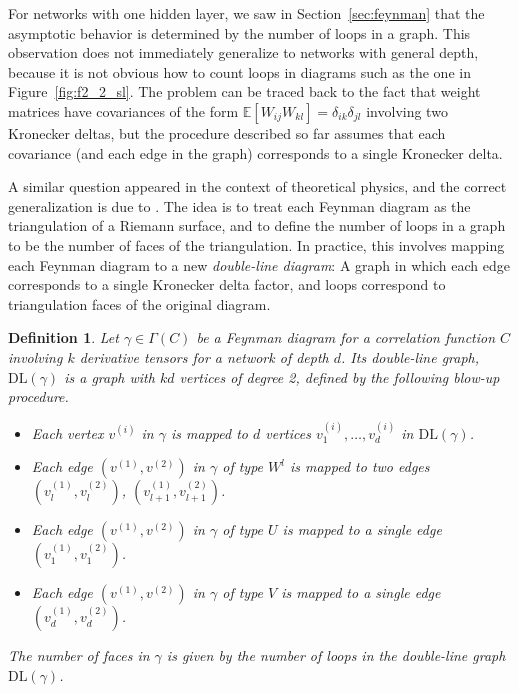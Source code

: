 \documentclass[english]{article}
\newtheorem{definition}{Definition}
\newcommand{\DL}{\mathrm{DL}}
\newcommand{\lexp}{\mathbb{E}\left[}
\newcommand{\rexp}{\right]}
\begin{document}
For networks with one hidden layer, we saw in Section~\ref{sec:feynman} that the asymptotic behavior is determined by the number of loops in a graph.
This observation does not immediately generalize to networks with general depth, because it is not obvious how to count loops in diagrams such as the one in Figure~\ref{fig:f2_2_sl}.
The problem can be traced back to the fact that weight matrices have covariances of the form $\lexp W_{ij} W_{kl} \rexp = \delta_{ik} \delta_{jl}$ involving two Kronecker deltas, but the procedure described so far assumes that each covariance (and each edge in the graph) corresponds to a single Kronecker delta.

A similar question appeared in the context of theoretical physics, and the correct generalization is due to \cite{tHooft:1973alw}.
The idea is to treat each Feynman diagram as the triangulation of a Riemann surface, and to define the number of loops in a graph to be the number of faces of the triangulation.
In practice, this involves mapping each Feynman diagram to a new \emph{double-line diagram}: A graph in which each edge corresponds to a single Kronecker delta factor, and loops correspond to triangulation faces of the original diagram.
\begin{definition} \label{def:dl}
  Let $\gamma \in \Gamma(C)$ be a Feynman diagram for a correlation function $C$ involving $k$ derivative tensors for a network of depth $d$.
  Its \emph{double-line graph}, $\DL(\gamma)$ is a graph with $kd$ vertices of degree 2, defined by the following blow-up procedure.
  \begin{itemize}
  \item Each vertex $v^{(i)}$ in $\gamma$ is mapped to $d$ vertices $v^{(i)}_1,\dots,v^{(i)}_{d}$ in $\DL(\gamma)$.
  \item Each edge $(v^{(1)},v^{(2)})$ in $\gamma$ of type $W^l$ is mapped to two edges $(v^{(1)}_l,v^{(2)}_l)$, $(v^{(1)}_{l+1},v^{(2)}_{l+1})$.
  \item Each edge $(v^{(1)},v^{(2)})$ in $\gamma$ of type $U$ is mapped to a single edge $(v^{(1)}_1,v^{(2)}_1)$.
  \item Each edge $(v^{(1)},v^{(2)})$ in $\gamma$ of type $V$ is mapped to a single edge $(v^{(1)}_d,v^{(2)}_d)$.
  \end{itemize}
  The number of \emph{faces} in $\gamma$ is given by the number of loops in the double-line graph $\DL(\gamma)$.
\end{definition}
\end{document}
